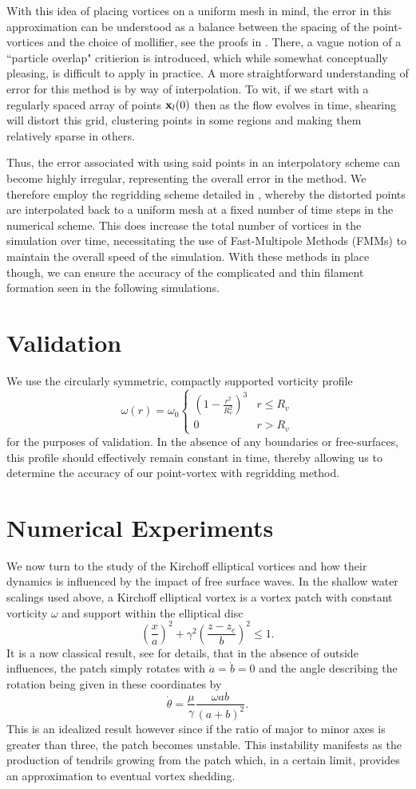 \documentclass[a4paper,11pt]{article}
\newcommand{\ba}{\begin{array}}
\newcommand{\ea}{\end{array}}
\begin{document}
With this idea of placing vortices on a uniform mesh in mind, the error in this approximation can be understood as a balance between the spacing of the point-vortices and the choice of mollifier, see the proofs in \cite{cottet}.  There, a vague notion of a ``particle overlap" critierion is introduced, which while somewhat conceptually pleasing, is difficult to apply in practice.  A more straightforward understanding of error for this method is by way of interpolation.  To wit, if we start with a regularly spaced array of points ${\bf x}_{l}(0)$ then as the flow evolves in time, shearing will distort this grid, clustering points in some regions and making them relatively sparse in others.  

Thus, the error associated with using said points in an interpolatory scheme can become highly irregular, representing the overall error in the method.  We therefore employ the regridding scheme detailed in \cite{cottet}, whereby the distorted points are interpolated back to a uniform mesh at a fixed number of time steps in the numerical scheme.  This does increase the total number of vortices in the simulation over time, necessitating the use of Fast-Multipole Methods (FMMs) to maintain the overall speed of the simulation.  With these methods in place though, we can ensure the accuracy of the complicated and thin filament formation seen in the following simulations.      

\section*{Validation}
We use the circularly symmetric, compactly supported vorticity profile
\[
\omega(r) = \omega_{0}\left\{  \ba{rl} \left(1-\frac{r^{2}}{R_{v}^{2}}\right)^{3} & r\leq R_{v} \\ 0 & r>R_{v} \ea\right.
\] 
for the purposes of validation.  In the absence of any boundaries or free-surfaces, this profile should effectively remain constant in time, thereby allowing us to determine the accuracy of our point-vortex with regridding method.  
\section*{Numerical Experiments}
We now turn to the study of the Kirchoff elliptical vortices \cite{mitchell,crosby} and how their dynamics is influenced by the impact of free surface waves.  In the shallow water scalings used above, a Kirchoff elliptical vortex is a vortex patch with constant vorticity $\omega$ and support within the elliptical disc
\[
\left(\frac{x}{a}\right)^{2} + \gamma^{2}\left(\frac{z-z_{c}}{b} \right)^{2} \leq 1.
\]
It is a now classical result, see \cite{mitchell} for details, that in the absence of outside influences, the patch simply rotates with $\dot{a}=\dot{b}=0$ and the angle describing the rotation being given in these coordinates by 
\[
\dot{\theta} = \frac{\mu}{\gamma} \frac{\omega ab}{(a+b)^{2}}.
\]
This is an idealized result however since if the ratio of major to minor axes is greater than three, the patch becomes unstable.  This instability manifests as the production of tendrils growing from the patch which, in a certain limit, provides an approximation to eventual vortex shedding.  
\end{document}
